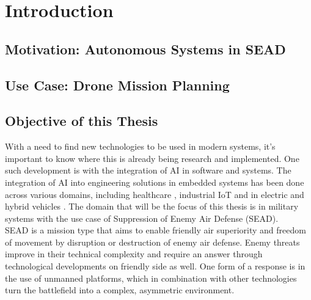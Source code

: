 \chapter{Introduction}

\section{Motivation: Autonomous Systems in SEAD}
\section{Use Case: Drone Mission Planning}
\section{Objective of this Thesis}

With a need to find new technologies to be used in modern systems, it's important to know where this is already being research and implemented. One such development is with the integration of AI in software and systems. The integration of AI into engineering solutions in embedded systems has been done across various domains, including healthcare \parencite{aziz_systematic_2026}, industrial IoT \parencite{dini_overview_2024} and in electric and hybrid vehicles \parencite{waheed_artificial_2026}. The domain that will be the focus of this thesis is in military systems with the use case of Suppression of Enemy Air Defense (SEAD). \\
SEAD is a mission type that aims to enable friendly air superiority and freedom of movement by disruption or destruction of enemy air defense. Enemy threats improve in their technical complexity and require an answer through technological developments on friendly side as well. One form of a response is in the use of unmanned platforms, which in combination with other technologies turn the battlefield into a complex, asymmetric environment. \parencite{Speed2018SEAD} 

